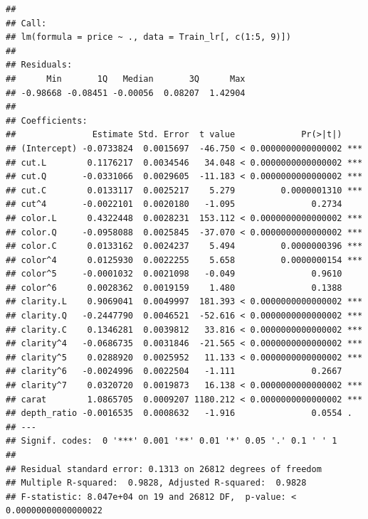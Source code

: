 \documentclass[
]{article}
\begin{document}
\begin{verbatim}
## 
## Call:
## lm(formula = price ~ ., data = Train_lr[, c(1:5, 9)])
## 
## Residuals:
##      Min       1Q   Median       3Q      Max 
## -0.98668 -0.08451 -0.00056  0.08207  1.42904 
## 
## Coefficients:
##               Estimate Std. Error  t value             Pr(>|t|)    
## (Intercept) -0.0733824  0.0015697  -46.750 < 0.0000000000000002 ***
## cut.L        0.1176217  0.0034546   34.048 < 0.0000000000000002 ***
## cut.Q       -0.0331066  0.0029605  -11.183 < 0.0000000000000002 ***
## cut.C        0.0133117  0.0025217    5.279         0.0000001310 ***
## cut^4       -0.0022101  0.0020180   -1.095               0.2734    
## color.L      0.4322448  0.0028231  153.112 < 0.0000000000000002 ***
## color.Q     -0.0958088  0.0025845  -37.070 < 0.0000000000000002 ***
## color.C      0.0133162  0.0024237    5.494         0.0000000396 ***
## color^4      0.0125930  0.0022255    5.658         0.0000000154 ***
## color^5     -0.0001032  0.0021098   -0.049               0.9610    
## color^6      0.0028362  0.0019159    1.480               0.1388    
## clarity.L    0.9069041  0.0049997  181.393 < 0.0000000000000002 ***
## clarity.Q   -0.2447790  0.0046521  -52.616 < 0.0000000000000002 ***
## clarity.C    0.1346281  0.0039812   33.816 < 0.0000000000000002 ***
## clarity^4   -0.0686735  0.0031846  -21.565 < 0.0000000000000002 ***
## clarity^5    0.0288920  0.0025952   11.133 < 0.0000000000000002 ***
## clarity^6   -0.0024996  0.0022504   -1.111               0.2667    
## clarity^7    0.0320720  0.0019873   16.138 < 0.0000000000000002 ***
## carat        1.0865705  0.0009207 1180.212 < 0.0000000000000002 ***
## depth_ratio -0.0016535  0.0008632   -1.916               0.0554 .  
## ---
## Signif. codes:  0 '***' 0.001 '**' 0.01 '*' 0.05 '.' 0.1 ' ' 1
## 
## Residual standard error: 0.1313 on 26812 degrees of freedom
## Multiple R-squared:  0.9828, Adjusted R-squared:  0.9828 
## F-statistic: 8.047e+04 on 19 and 26812 DF,  p-value: < 0.00000000000000022
\end{verbatim}
\end{document}
